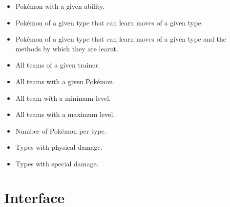 \documentclass{article}
\begin{document}
\begin{itemize}
    \item Pok\'emon with a given ability.
    \item Pok\'emon of a given type that can learn moves of a given type.
    \item Pok\'emon of a given type that can learn moves of a given type and the methods by which
        they are learnt.
    \item All teams of a given trainer.
    \item All teams with a given Pok\'emon.
    \item All team with a minimum level.
    \item All teams with a maximum level.
    \item Number of Pok\'emon per type.
    \item Types with physical damage.
    \item Types with special damage.
\end{itemize}

\section{Interface}
\end{document}
